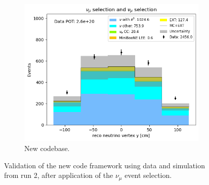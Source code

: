 \begin{figure}[H]
\begin{subfigure}[t]{0.32\linewidth}
        \includegraphics[width=\linewidth]{technote/Appendix_Validation/Figures/Numu/Run2_Vertex_Y_Alex.png}
        \caption{New codebase.}
    \end{subfigure}
    \caption{Validation of the new code framework using data and simulation from run 2, after application of the $\nu_{\mu}$ event selection.}
\end{figure}

